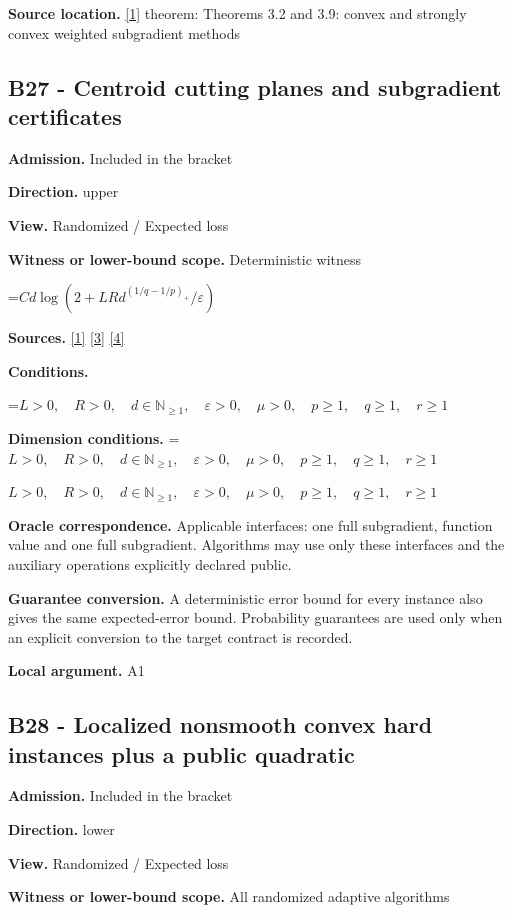 \documentclass[10pt,a4paper]{article}
\newcommand{\AtlasMath}[1]{\par\begingroup\centering\setbox0=\hbox{$\displaystyle #1$}\ifdim\wd0>1.4\linewidth\typeout{ATLAS WIDE FORMULA: \the\wd0}\fi\ifdim\wd0>\linewidth\resizebox{\linewidth}{!}{\box0}\else\box0\fi\par\endgroup}
\newcommand{\AtlasInlineMath}[1]{\begingroup\setbox0=\hbox{$#1$}\ifdim\wd0>.4\linewidth\endgroup\AtlasMath{#1}\else\endgroup$#1$\fi}
\begin{document}
\textbf{Source location.} \href{https://arxiv.org/pdf/1405.4980}{[1]} theorem: Theorems 3.2 and 3.9: convex and strongly convex weighted subgradient methods

\subsection{B27 - Centroid cutting planes and subgradient certificates}
\textbf{Admission.} Included in the bracket

\textbf{Direction.} upper

\textbf{View.} Randomized / Expected loss

\textbf{Witness or lower-bound scope.} Deterministic witness

\AtlasMath{C d\log(2+LRd^{(1/q-1/p)_+}/\varepsilon)}
\textbf{Sources.} \href{https://arxiv.org/pdf/1405.4980}{[1]} \href{https://www2.isye.gatech.edu/~nemirovs/MOR_AccuracyCertificates.pdf}{[3]} \href{https://arxiv.org/pdf/2609.20701}{[4]}

\textbf{Conditions.} 
\AtlasMath{L>0,\quad R>0,\quad d\in\mathbb{N}_{\ge1},\quad \varepsilon>0,\quad \mu>0,\quad p\ge1,\quad q\ge1,\quad r\ge1}


\textbf{Dimension conditions.} \AtlasInlineMath{L>0,\quad R>0,\quad d\in\mathbb{N}_{\ge1},\quad \varepsilon>0,\quad \mu>0,\quad p\ge1,\quad q\ge1,\quad r\ge1}

\textbf{Oracle correspondence.} Applicable interfaces: one full subgradient, function value and one full subgradient. Algorithms may use only these interfaces and the auxiliary operations explicitly declared public.

\textbf{Guarantee conversion.} A deterministic error bound for every instance also gives the same expected-error bound. Probability guarantees are used only when an explicit conversion to the target contract is recorded.

\textbf{Local argument.} A1

\subsection{B28 - Localized nonsmooth convex hard instances plus a public quadratic}
\textbf{Admission.} Included in the bracket

\textbf{Direction.} lower

\textbf{View.} Randomized / Expected loss

\textbf{Witness or lower-bound scope.} All randomized adaptive algorithms
\end{document}
